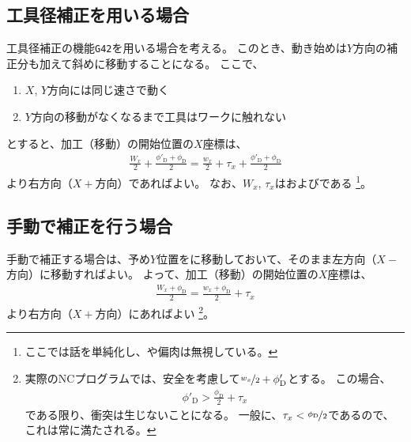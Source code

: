 \subsection{工具径補正を用いる場合}
工具径補正の機能\verb|G42|を用いる場合を考える。
このとき、動き始めは$Y$方向の補正分も加えて斜めに移動することになる。
ここで、
\begin{enumerate}[label=\sarrow]
\item $X$, $Y$方向には同じ速さで動く
\item $Y$方向の移動がなくなるまで工具はワークに触れない
\end{enumerate}
とすると、加工（移動）の開始位置の$X$座標は、
\begin{align*}
  \frac{W_x}2+\frac{\phi'_\mathrm D+\phi_\mathrm D}2
  = \frac{w_x}2+\tau_x+\frac{\phi'_\mathrm D+\phi_\mathrm D}2
\end{align*}
より右方向（$X+$方向）であればよい。
なお、$W_x$, $\tau_x$は\ACOD および\ACThickness である
\footnote{ここでは話を単純化し、\PlatingThk や偏肉は無視している。}。


\clearpage
\subsection{手動で補正を行う場合}
手動で補正する場合は、予め$Y$位置をに移動しておいて、そのまま左方向（$X-$方向）に移動すればよい。
よって、加工（移動）の開始位置の$X$座標は、
\begin{align*}
  \frac{W_x+\phi_\mathrm D}2 = \frac{w_x+\phi_\mathrm D}2+\tau_x
\end{align*}
より右方向（$X+$方向）にあればよい
\footnote{実際のNCプログラムでは、安全を考慮して$\nicefrac{w_x}2+\phi'_\mathrm D$とする。
この場合、
\begin{align*}
  \phi'_\mathrm D > \frac{\phi_\mathrm D}2+\tau_x
\end{align*}
である限り、衝突は生じないことになる。
一般に、$\tau_x < \nicefrac{\phi_\mathrm D}2$であるので、これは常に満たされる。}。

